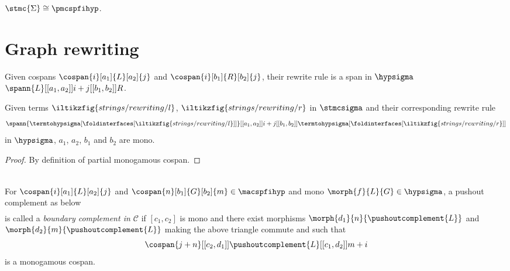 \begin{corollary}
    \(\stmc{\Sigma} \cong \pmcspfihyp\).
\end{corollary}

\section{Graph rewriting}

\begin{definition}
    Given cospans \(\cospan{i}[a_1]{L}[a_2]{j}\) and \(\cospan{i}[b_1]{R}[b_2]{j}\), their rewrite rule is a span in \(\hypsigma\) \(\spann{L}[[a_1,a_2]]{i+j}[[b_1,b_2]]{R}\).
\end{definition}

\begin{lemma}
    Given terms \(\iltikzfig{strings/rewriting/l}\), \(\iltikzfig{strings/rewriting/r}\) in \(\stmcsigma\) and their corresponding rewrite rule \[
        \spann{
            \termtohypsigma[\foldinterfaces[\iltikzfig{strings/rewriting/l}]]
        }[[a_1, a_2]]{
            i + j
        }[[b_1, b_2]]{
            \termtohypsigma[\foldinterfaces[\iltikzfig{strings/rewriting/r}]]
        }
    \] in \(\hypsigma\), \(a_1\), \(a_2\), \(b_1\) and \(b_2\) are mono.
\end{lemma}
\begin{proof}
    By definition of partial monogamous cospan.
\end{proof}

\begin{definition}[DPO]
    \begin{gather}
        \label{gath:dpo}
        
    \end{gather}
\end{definition}

\begin{definition}\label{def:boundary-complement}
    For \(\cospan{i}[a_1]{L}[a_2]{j}\) and \(\cospan{n}[b_1]{G}[b_2]{m} \in \macspfihyp\) and mono \(\morph{f}{L}{G} \in \hypsigma\), a pushout complement as below
    \begin{gather}
        
    \end{gather}
    is called a \emph{boundary complement in \(\mathcal{C}\)} if \([c_1, c_2]\) is mono and there exist morphisms \(\morph{d_1}{n}{\pushoutcomplement{L}}\) and \(\morph{d_2}{m}{\pushoutcomplement{L}}\) making the above triangle commute and such that \[\cospan{j+n}[[c_2,d_1]]{\pushoutcomplement{L}}[[c_1,d_2]]{{m+i}}\] is a monogamous cospan.
\end{definition}

